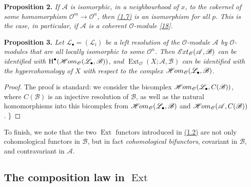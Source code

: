 \documentclass{article}
\newenvironment{itenv}[1]
  {\phantomsection\par\smallskip\noindent\textbf{#1.}\itshape}
  {\par\smallskip}
\newcommand{\oldpage}[1]{\marginpar{\footnotesize$\Big\vert$ \textit{p.~#1}}}
\theoremstyle{definition}
\theoremstyle{definition}
\theoremstyle{definition}
\theoremstyle{definition}
\theoremstyle{remark}
\begin{document}
\leavevmode{}%
\begin{itenv}{Proposition 2}
If \({\mathscr{A}}\) is isomorphic, in a neighbourhood of \(x\), to the cokernel of some homomorphism \({\mathscr{O}}^m\to{\mathscr{O}}^n\), then \protect\hyperlink{fga-1-equation-1.7}{(1.7)} is an isomorphism for all \(p\).
This is the case, in particular, if \({\mathscr{A}}\) is a coherent \({\mathscr{O}}\)-module {[}\protect\hyperlink{ref-Ser1955}{18}{]}.

\end{itenv}

\leavevmode{}%
\begin{itenv}{Proposition 3}
\oldpage{149-03}Let \({\mathscr{L}}_\bullet=({\mathscr{L}}_i)\) be a left resolution of the \({\mathscr{O}}\)-module \({\mathscr{A}}\) by \({\mathscr{O}}\)-modules that are all locally isomorphic to some \({\mathscr{O}}^n\).
Then \(\mathscr{E}\kern -.5pt xt_{\mathscr{O}}({\mathscr{A}},{\mathscr{B}})\) can be identified with \(\operatorname{H}^\bullet(\mathscr{H}\kern -.5pt om_{\mathscr{O}}({\mathscr{L}}_\bullet,{\mathscr{B}}))\), and \(\operatorname{Ext}_{\mathscr{O}}(X;{\mathscr{A}},{\mathscr{B}})\) can be identified with the hypercohomology of \(X\) with respect to the complex \(\mathscr{H}\kern -.5pt om_{\mathscr{O}}({\mathscr{L}}_\bullet,{\mathscr{B}})\).

\end{itenv}

\begin{proof}
The proof is standard: we consider the bicomplex \(\mathscr{H}\kern -.5pt om_{\mathscr{O}}({\mathscr{L}}_\bullet,C({\mathscr{B}}))\), where \(C({\mathscr{B}})\) is an injective resolution of \({\mathscr{B}}\), as well as the natural homomorphisms into this bicomplex from \(\mathscr{H}\kern -.5pt om_{\mathscr{O}}({\mathscr{L}}_\bullet,{\mathscr{B}})\) and \(\mathscr{H}\kern -.5pt om_{\mathscr{O}}({\mathscr{A}},C({\mathscr{B}}))\).
\}
\end{proof}

To finish, we note that the two \(\operatorname{Ext}\) functors introduced in \protect\hyperlink{fga-1-equation-1.2}{(1.2)} are not only cohomological functors in \({\mathscr{B}}\), but in fact \emph{cohomological bifunctors}, covariant in \({\mathscr{B}}\), and contravariant in \({\mathscr{A}}\).

\hypertarget{fga-1-section-2}{%
\subsection{\texorpdfstring{The composition law in \(\operatorname{Ext}\)}{The composition law in \textbackslash operatorname\{Ext\}}}\label{fga-1-section-2}}
\end{document}
